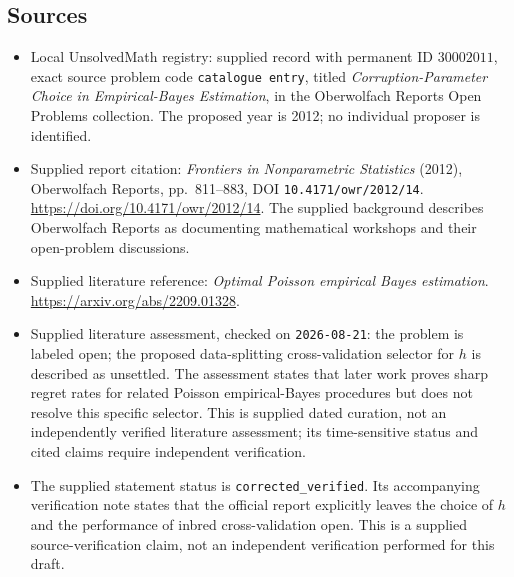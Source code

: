\documentclass[11pt]{article}
\begin{document}
\subsection{Sources}
\begin{itemize}
\item Local UnsolvedMath registry: supplied record with permanent ID \(30002011\), exact source problem code \texttt{catalogue entry}, titled \emph{Corruption-Parameter Choice in Empirical-Bayes Estimation}, in the Oberwolfach Reports Open Problems collection. The proposed year is 2012; no individual proposer is identified.
\item Supplied report citation: \emph{Frontiers in Nonparametric Statistics} (2012), Oberwolfach Reports, pp.~811--883, DOI \texttt{10.4171/owr/2012/14}. \url{https://doi.org/10.4171/owr/2012/14}. The supplied background describes Oberwolfach Reports as documenting mathematical workshops and their open-problem discussions.
\item Supplied literature reference: \emph{Optimal Poisson empirical Bayes estimation}. \url{https://arxiv.org/abs/2209.01328}.
\item Supplied literature assessment, checked on \texttt{2026-08-21}: the problem is labeled open; the proposed data-splitting cross-validation selector for \(h\) is described as unsettled. The assessment states that later work proves sharp regret rates for related Poisson empirical-Bayes procedures but does not resolve this specific selector. This is supplied dated curation, not an independently verified literature assessment; its time-sensitive status and cited claims require independent verification.
\item The supplied statement status is \texttt{corrected\_verified}. Its accompanying verification note states that the official report explicitly leaves the choice of \(h\) and the performance of inbred cross-validation open. This is a supplied source-verification claim, not an independent verification performed for this draft.
\end{itemize}
\end{document}
